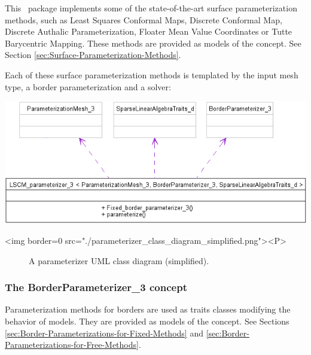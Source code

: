 This \cgal\ package implements some of the state-of-the-art
surface parameterization methods, such as Least Squares Conformal Maps,
Discrete Conformal Map, Discrete Authalic
Parameterization, Floater Mean Value Coordinates or Tutte Barycentric
Mapping. These methods are provided as models of the
 concept. See Section \ref{sec:Surface-Parameterization-Methods}.

Each of these surface parameterization methods is templated by
the input mesh type, a border parameterization and a solver:

\begin{center}
    \label{Surface_mesh_parameterization-fig-parameterizer_class_diagram_simplified}
    \begin{ccTexOnly}
        \includegraphics{Surface_mesh_parameterization/parameterizer_class_diagram_simplified} %
    \end{ccTexOnly}
    \begin{ccHtmlOnly}
        <img border=0 src="./parameterizer_class_diagram_simplified.png"><P>
    \end{ccHtmlOnly}
    \begin{figure}[h]
        \caption{A parameterizer UML class diagram (simplified).}
    \end{figure}
\end{center}


\subsubsection{The BorderParameterizer\_3 concept}

Parameterization methods for
borders are used as traits classes modifying the behavior of
 models.
They are provided as models of the  concept.
See Sections \ref{sec:Border-Parameterizations-for-Fixed-Methods}
and \ref{sec:Border-Parameterizations-for-Free-Methods}.


